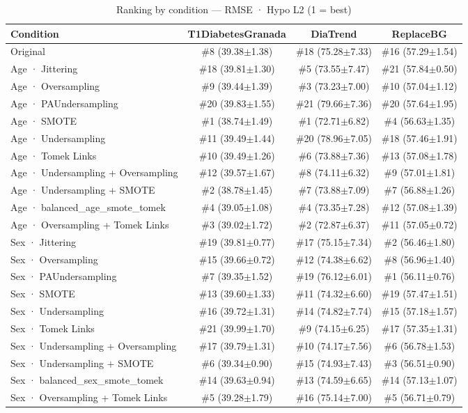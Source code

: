 \begin{table}[htbp]
\centering
\small
\caption{Ranking by condition — RMSE · Hypo L2  (1 = best)}
\label{tab:ranking_rmse_tbr_2}
\begin{tabular}{lccc}
\toprule
\textbf{Condition} & \textbf{T1DiabetesGranada} & \textbf{DiaTrend} & \textbf{ReplaceBG} \\
\midrule
Original & \#8 (39.38$\pm$1.38) & \#18 (75.28$\pm$7.33) & \#16 (57.29$\pm$1.54) \\
Age · Jittering & \#18 (39.81$\pm$1.30) & \#5 (73.55$\pm$7.47) & \#21 (57.84$\pm$0.50) \\
Age · Oversampling & \#9 (39.44$\pm$1.39) & \#3 (73.23$\pm$7.00) & \#10 (57.04$\pm$1.12) \\
Age · PAUndersampling & \#20 (39.83$\pm$1.55) & \#21 (79.66$\pm$7.36) & \#20 (57.64$\pm$1.95) \\
Age · SMOTE & \#1 (38.74$\pm$1.49) & \#1 (72.71$\pm$6.82) & \#4 (56.63$\pm$1.35) \\
Age · Undersampling & \#11 (39.49$\pm$1.44) & \#20 (78.96$\pm$7.05) & \#18 (57.46$\pm$1.91) \\
Age · Tomek Links & \#10 (39.49$\pm$1.26) & \#6 (73.88$\pm$7.36) & \#13 (57.08$\pm$1.78) \\
Age · Undersampling + Oversampling & \#12 (39.57$\pm$1.67) & \#8 (74.11$\pm$6.32) & \#9 (57.01$\pm$1.81) \\
Age · Undersampling + SMOTE & \#2 (38.78$\pm$1.45) & \#7 (73.88$\pm$7.09) & \#7 (56.88$\pm$1.26) \\
Age · balanced_age_smote_tomek & \#4 (39.05$\pm$1.08) & \#4 (73.35$\pm$7.28) & \#12 (57.08$\pm$1.39) \\
Age · Oversampling + Tomek Links & \#3 (39.02$\pm$1.72) & \#2 (72.87$\pm$6.37) & \#11 (57.05$\pm$0.72) \\
\midrule
Sex · Jittering & \#19 (39.81$\pm$0.77) & \#17 (75.15$\pm$7.34) & \#2 (56.46$\pm$1.80) \\
Sex · Oversampling & \#15 (39.66$\pm$0.72) & \#12 (74.38$\pm$6.62) & \#8 (56.96$\pm$1.40) \\
Sex · PAUndersampling & \#7 (39.35$\pm$1.52) & \#19 (76.12$\pm$6.01) & \#1 (56.11$\pm$0.76) \\
Sex · SMOTE & \#13 (39.60$\pm$1.33) & \#11 (74.32$\pm$6.60) & \#19 (57.47$\pm$1.51) \\
Sex · Undersampling & \#16 (39.72$\pm$1.31) & \#14 (74.82$\pm$7.74) & \#15 (57.18$\pm$1.57) \\
Sex · Tomek Links & \#21 (39.99$\pm$1.70) & \#9 (74.15$\pm$6.25) & \#17 (57.35$\pm$1.31) \\
Sex · Undersampling + Oversampling & \#17 (39.79$\pm$1.31) & \#10 (74.17$\pm$7.56) & \#6 (56.78$\pm$1.53) \\
Sex · Undersampling + SMOTE & \#6 (39.34$\pm$0.90) & \#15 (74.93$\pm$7.43) & \#3 (56.51$\pm$0.90) \\
Sex · balanced_sex_smote_tomek & \#14 (39.63$\pm$0.94) & \#13 (74.59$\pm$6.65) & \#14 (57.13$\pm$1.07) \\
Sex · Oversampling + Tomek Links & \#5 (39.28$\pm$1.79) & \#16 (75.14$\pm$7.00) & \#5 (56.71$\pm$0.79) \\
\bottomrule
\end{tabular}
\end{table}
